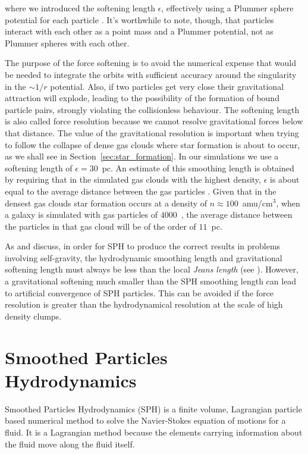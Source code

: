 where we introduced the softening length $\epsilon$, effectively using a Plummer sphere potential for each particle \citep{Plummer1911}.
It's worthwhile to note, though, that particles interact with each other as a point mass and a Plummer potential, not as Plummer spheres with each other.

The purpose of the force softening is to avoid the numerical expense that would be needed to integrate the orbits with sufficient accuracy around the singularity in the $\sim 1/r$ potential.
Also, if two particles get very close their gravitational attraction will explode, leading to the possibility of the formation of bound particle pairs, strongly violating the collisionless behaviour.
The softening length is also called force resolution because we cannot resolve gravitational forces below that distance.
The value of the gravitational resolution is important when trying to follow the collapse of dense gas clouds where star formation is about to occur, as we shall see in Section~\ref{sec:star_formation}.
In our simulations we use a softening length of $\epsilon=30$~pc.
An estimate of this smoothing length is obtained by requiring that in the simulated gas clouds with the highest density, $\epsilon$ is about equal to the average distance between the gas particles \citep{Schroyen2013}. %
Given that in the densest gas clouds star formation occurs at a density of $n\approx100$~amu/cm$^{3}$, when a galaxy is simulated with gas particles of $4000$~\Msun{}, the average distance between the particles in that gas cloud will be of the order of $11$~pc.

As \citet{Bate1997} and \citet{Springel2005} discuss, in order for SPH to produce the correct results in problems involving self-gravity, the hydrodynamic smoothing length and gravitational softening length must always be less than the local \emph{Jeans length} (see ). However, a gravitational softening much smaller than the SPH smoothing length can lead to artificial convergence of SPH particles.
This can be avoided if the force resolution is greater than the hydrodynamical resolution at the scale of high density clumps.

\section{Smoothed Particles Hydrodynamics}\label{sec:SPH}
Smoothed Particles Hydrodynamics (SPH) is a finite volume, Lagrangian particle based numerical method to solve the Navier-Stokes equation of motions for a fluid.
It is a Lagrangian method because the elements carrying information about the fluid move along the fluid itself.

